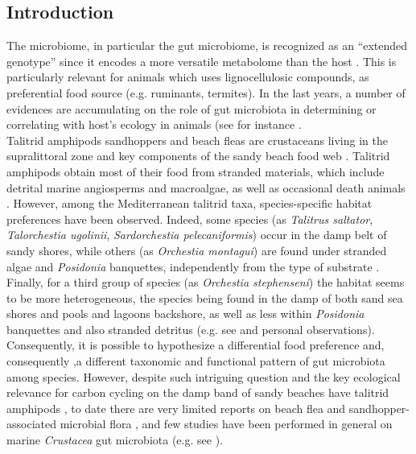 \subsection{Introduction}
The microbiome, in particular the gut microbiome, is recognized as an ``extended genotype'' since it encodes a more versatile metabolome than the host \cite{sommer2013gut}. This is particularly relevant for animals which uses lignocellulosic compounds, as preferential food source (e.g. ruminants, termites). In the last years, a number of evidences are accumulating on the role of gut microbiota in determining or correlating with host's ecology in animals (see for instance \cite{becker2009first, basu2010association, bauer2000characterization, behar2008gut, dittmer2012influence}.\\
Talitrid amphipods sandhoppers and beach fleas are crustaceans living in the supralittoral zone and key components of the sandy beach food web \cite{calosi2005physiological, calosi2007physiological, morritt1988osmoregulation, morritt1989ionic, morritt1998physiological, ugolini1995distribution, pardi1986zonal}. Talitrid amphipods obtain most of their food from stranded materials, which include detrital marine angiosperms and macroalgae, as well as occasional death animals \cite{adin2003preferential}. However, among the Mediterranean talitrid taxa, species-specific habitat preferences have been observed. Indeed, some species (as \textit{Talitrus saltator}, \textit{Talorchestia ugolinii}, \textit{Sardorchestia pelecaniformis}) occur in the damp belt of sandy shores, while others (as \textit{Orchestia montagui}) are found under stranded algae and \textit{Posidonia} banquettes, independently from the type of substrate \cite{ugolini1995distribution, pavesi2013genetic}. Finally, for a third group of species (as \textit{Orchestia stephenseni}) the habitat seems to be more heterogeneous, the species being found in the damp of both sand sea shores and pools and lagoons backshore, as well as less within \textit{Posidonia} banquettes and also stranded detritus (e.g. see \cite{pavesi2013genetic, matthaeis2000isolation, lowry2013substrate, deidun2009considerations} and personal observations). Consequently, it is possible to hypothesize a differential food preference and, consequently ,a different taxonomic and functional pattern of gut microbiota among species. However, despite such intriguing question and the key ecological relevance for carbon cycling on the damp band of sandy beaches have talitrid amphipods \cite{griffiths1983kelp}, to date there are very limited reports on beach flea and sandhopper-associated microbial flora \cite{dittmer2012influence, mengoni2013high, nuti1971microrganisms}, and few studies have been performed in general on marine \textit{Crustacea} gut microbiota (e.g. see \cite{harris1993presence, zimmer2001hepatopancreatic, harris1993widespread}).\\
